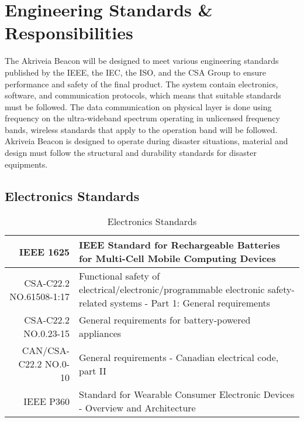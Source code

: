 

\setcounter{section}{3}
\section{Engineering Standards \& Responsibilities}
\bigskip
The Akriveia Beacon will be designed to meet various engineering standards published by the \Gls{IEEE}, the \Gls{IEC}, the \Gls{ISO}, and the \Gls{CSA} Group to ensure performance and safety of the final product. The system contain electronics, software, and communication protocols, which means that suitable standards must be followed. The data communication on physical layer is done using frequency on the ultra-wideband spectrum operating in unlicensed frequency bands, wireless standards that apply to the operation band will be followed. Akriveia Beacon is designed to operate during disaster situations, material and design must follow the structural and durability standards for disaster equipments. 


\subsection{Electronics Standards}
\bgroup
\def\arraystretch{1.5}
\begin{table}[H]
\centering
\begin{tabular}{ |p{3cm} p{11cm} | }
\hline
\multicolumn{1}{|r|}{IEEE 1625} & IEEE Standard for Rechargeable Batteries for Multi-Cell Mobile Computing Devices \cite{R7}\\ 
\hline
\multicolumn{1}{|r|}{CSA-C22.2 NO.61508-1:17} & Functional safety of electrical/electronic/programmable electronic safety-related systems - Part 1: General requirements \cite{R8}\\ 
\hline
\multicolumn{1}{|r|}{CSA-C22.2 NO.0.23-15} & General requirements for battery-powered appliances \cite{R9}\\  
\hline
\multicolumn{1}{|r|}{CAN/CSA-C22.2 NO.0-10} & General requirements - Canadian electrical code, part II \cite{R10}\\ 
\hline
\multicolumn{1}{|r|}{IEEE P360} & Standard for Wearable Consumer Electronic Devices - Overview and Architecture \cite{R11} \\  
\hline
\end{tabular}
\caption{Electronics Standards}
\end{table}	
\medskip


